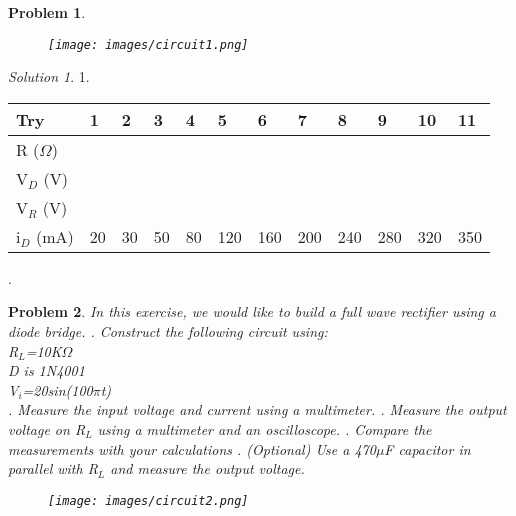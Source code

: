 \documentclass[11pt,a4paper,notitlepage]{article}
\theoremstyle{plain}
\newtheorem{problem}{Problem}[section]
\theoremstyle{remark}
\newtheorem*{solution}{Solution}
\begin{document}
{{{\begin{problem}
		\begin{figure}[h!]
			\centering
			\texttt{[image: images/circuit1.png]}
		\end{figure}
	\end{problem}
	
	\begin{solution}
		1.
		\begin{table}[h]
			\begin{tabular}{| l | l | l | l | l | l | l | l | l | l | l | l |}
				\hline
				Try          & 1 & 2 & 3 & 4 & 5 & 6 & 7 & 8 & 9 & 10 & 11 \\ \hline
				R (\(\Omega\))   &   &   &   &   &   &   &   &   &   &    &    \\ \hline
				V$_{D}$ (V)  &   &   &   &   &   &   &   &   &   &    &    \\ \hline
				V$_{R}$ (V)  &   &   &   &   &   &   &   &   &   &    &    \\ \hline
				i$_{D}$ (mA) & 20 & 30 & 50 & 80 & 120 & 160 & 200 & 240 & 280 & 320 & 350 \\ \hline
			\end{tabular}
		\end{table}
		.
	\end{solution}
	
	\begin{problem}
		In this exercise, we would like to build a full wave rectifier using a diode bridge.
		. Construct the following circuit using:\\
		R\(_{L}\)=10K\(\Omega\)\\
		D is 1N4001\\
		V\(_{i}\)=20sin(100\(\pi\)t)\\
		. Measure the input voltage and current using a multimeter.
		. Measure the output voltage on R\(_{L}\) using a multimeter and an oscilloscope.
		. Compare the measurements with your calculations
		. (Optional) Use a 470\(\mu\)F capacitor in parallel with R\(_{L}\) and measure the output voltage.
		\begin{figure}[h!]
			\centering
			\texttt{[image: images/circuit2.png]}
		\end{figure}
	\end{problem}
	
}}}
\end{document}
